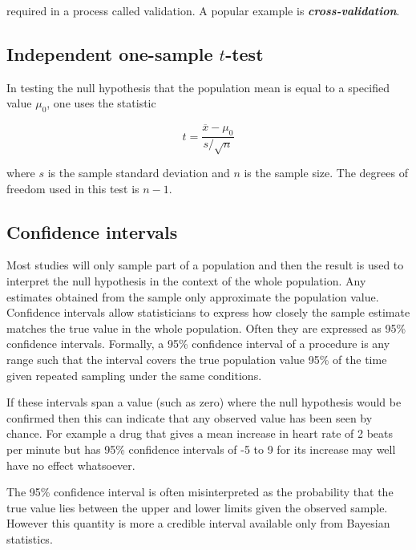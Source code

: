 required in a process called validation. A popular example is \textbf{\emph{cross-validation}}.

 








\subsection{Independent one-sample $t$-test}

In testing the null hypothesis that the population mean is equal to a specified value $\mu_{0}$, one uses the statistic

 

\begin{equation}t = \frac{\overline{x} - \mu_0}{s / \sqrt{n}}\end{equation}

 

where $s$ is the sample standard deviation and $n$ is the sample size. The degrees of freedom used in this test is $n - 1$.\subsection{Confidence intervals}

 

Most studies will only sample part of a population and then the result is used to interpret the null hypothesis in the context of the whole population. Any estimates obtained from the sample only approximate the population value. Confidence intervals allow statisticians to express how closely the sample estimate matches the true value in the whole population. Often they are expressed as 95\% confidence intervals. Formally, a 95\% confidence interval of a procedure is any range such that the interval covers the true population value 95\% of the time given repeated sampling under the same conditions.

 

If these intervals span a value (such as zero) where the null hypothesis would be confirmed then this can indicate that any observed value has been seen by chance. For example a drug that gives a mean increase in heart rate of 2 beats per minute but has 95\% confidence intervals of -5 to 9 for its increase may well have no effect whatsoever.

 

The 95\% confidence interval is often misinterpreted as the probability that the true value lies between the upper and lower limits given the observed sample. However this quantity is more a credible interval available only from Bayesian statistics.

